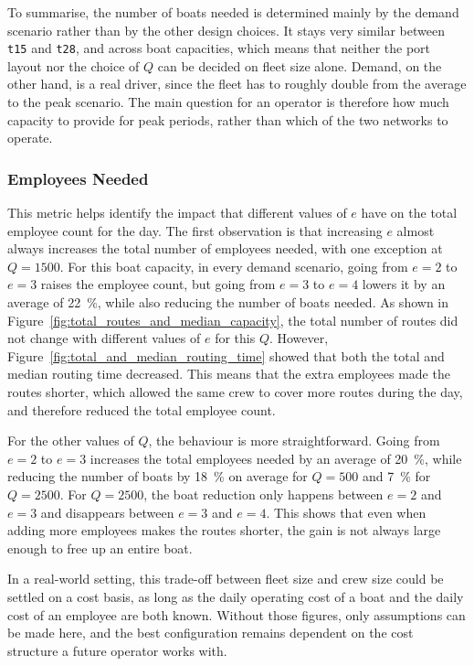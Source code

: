 \documentclass[12pt]{article}
\begin{document}
To summarise, the number of boats needed is determined mainly by the demand scenario rather than by the other design choices. It stays very similar between \texttt{t15} and \texttt{t28}, and across boat capacities, which means that neither the port layout nor the choice of \(Q\) can be decided on fleet size alone. Demand, on the other hand, is a real driver, since the fleet has to roughly double from the average to the peak scenario. The main question for an operator is therefore how much capacity to provide for peak periods, rather than which of the two networks to operate.

\subsubsection{Employees Needed}
\label{subsubsec:employees-needed}

This metric helps identify the impact that different values of \(e\) have on the total employee count for the day. The first observation is that increasing \(e\) almost always increases the total number of employees needed, with one exception at \(Q=1500\). For this boat capacity, in every demand scenario, going from \(e=2\) to \(e=3\) raises the employee count, but going from \(e=3\) to \(e=4\) lowers it by an average of \qty{22}{\percent}, while also reducing the number of boats needed. As shown in Figure~\ref{fig:total_routes_and_median_capacity}, the total number of routes did not change with different values of \(e\) for this \(Q\). However, Figure~\ref{fig:total_and_median_routing_time} showed that both the total and median routing time decreased. This means that the extra employees made the routes shorter, which allowed the same crew to cover more routes during the day, and therefore reduced the total employee count.

For the other values of \(Q\), the behaviour is more straightforward. Going from \(e=2\) to \(e=3\) increases the total employees needed by an average of \qty{20}{\percent}, while reducing the number of boats by \qty{18}{\percent} on average for \(Q=500\) and \qty{7}{\percent} for \(Q=2500\). For \(Q=2500\), the boat reduction only happens between \(e=2\) and \(e=3\) and disappears between \(e=3\) and \(e=4\). This shows that even when adding more employees makes the routes shorter, the gain is not always large enough to free up an entire boat.

In a real-world setting, this trade-off between fleet size and crew size could be settled on a cost basis, as long as the daily operating cost of a boat and the daily cost of an employee are both known. Without those figures, only assumptions can be made here, and the best configuration remains dependent on the cost structure a future operator works with.
\end{document}
